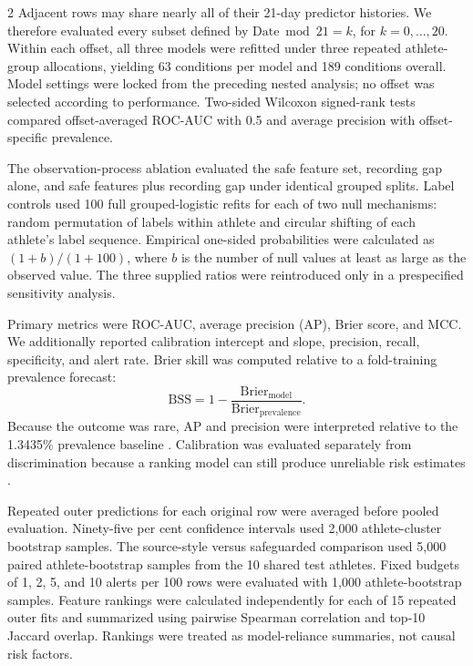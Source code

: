 \documentclass[11pt,a4paper]{article}
\begin{document}
\begin{multicols}{2}
Adjacent rows may share nearly all of their 21-day predictor histories. We therefore evaluated every subset defined by $\mathrm{Date}\bmod 21=k$, for $k=0,\ldots,20$. Within each offset, all three models were refitted under three repeated athlete-group allocations, yielding 63 conditions per model and 189 conditions overall. Model settings were locked from the preceding nested analysis; no offset was selected according to performance. Two-sided Wilcoxon signed-rank tests compared offset-averaged ROC-AUC with 0.5 and average precision with offset-specific prevalence.

The observation-process ablation evaluated the safe feature set, recording gap alone, and safe features plus recording gap under identical grouped splits. Label controls used 100 full grouped-logistic refits for each of two null mechanisms: random permutation of labels within athlete and circular shifting of each athlete's label sequence. Empirical one-sided probabilities were calculated as $(1+b)/(1+100)$, where $b$ is the number of null values at least as large as the observed value. The three supplied ratios were reintroduced only in a prespecified sensitivity analysis.

Primary metrics were ROC-AUC, average precision (AP), Brier score, and MCC. We additionally reported calibration intercept and slope, precision, recall, specificity, and alert rate. Brier skill was computed relative to a fold-training prevalence forecast:
\begin{equation}
\mathrm{BSS}=1-\frac{\mathrm{Brier}_{\mathrm{model}}}
{\mathrm{Brier}_{\mathrm{prevalence}}}.
\end{equation}
Because the outcome was rare, AP and precision were interpreted relative to the 1.3435\% prevalence baseline \cite{saito2015}. Calibration was evaluated separately from discrimination because a ranking model can still produce unreliable risk estimates \cite{vancalster2019}.

Repeated outer predictions for each original row were averaged before pooled evaluation. Ninety-five per cent confidence intervals used 2,000 athlete-cluster bootstrap samples. The source-style versus safeguarded comparison used 5,000 paired athlete-bootstrap samples from the 10 shared test athletes. Fixed budgets of 1, 2, 5, and 10 alerts per 100 rows were evaluated with 1,000 athlete-bootstrap samples. Feature rankings were calculated independently for each of 15 repeated outer fits and summarized using pairwise Spearman correlation and top-10 Jaccard overlap. Rankings were treated as model-reliance summaries, not causal risk factors.


\end{multicols}
\end{document}
